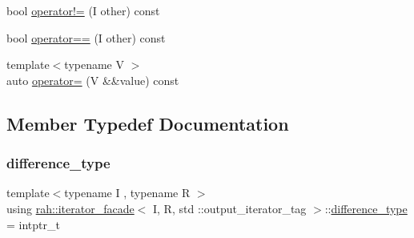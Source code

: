 \begin{DoxyCompactItemize}
\item 
bool \mbox{\hyperlink{structrah_1_1iterator__facade_3_01_i_00_01_r_00_01std_01_1_1output__iterator__tag_01_4_a72c1751a7267f5627a8bd21569a7e147}{operator!=}} (I other) const
\item 
bool \mbox{\hyperlink{structrah_1_1iterator__facade_3_01_i_00_01_r_00_01std_01_1_1output__iterator__tag_01_4_a41db7b320b25b73268ff256590fe306c}{operator==}} (I other) const
\item 
{\footnotesize template$<$typename V $>$ }\\auto \mbox{\hyperlink{structrah_1_1iterator__facade_3_01_i_00_01_r_00_01std_01_1_1output__iterator__tag_01_4_a0f85444e5a2d769ccffae7a6dce9a70d}{operator=}} (V \&\&value) const
\end{DoxyCompactItemize}


\subsection{Member Typedef Documentation}
\mbox{\label{structrah_1_1iterator__facade_3_01_i_00_01_r_00_01std_01_1_1output__iterator__tag_01_4_a3564661cd457ec25b43c0f7a831d1224}} 
\subsubsection{\texorpdfstring{difference\_type}{difference\_type}\hspace{0.1cm}{\footnotesize\ttfamily [1/2]}}
{\footnotesize\ttfamily template$<$typename I , typename R $>$ \\
using \mbox{\hyperlink{structrah_1_1iterator__facade}{rah\+::iterator\+\_\+facade}}$<$ I, R, std \+::output\+\_\+iterator\+\_\+tag $>$\+::\mbox{\hyperlink{structrah_1_1iterator__facade_3_01_i_00_01_r_00_01std_01_1_1output__iterator__tag_01_4_a3564661cd457ec25b43c0f7a831d1224}{difference\+\_\+type}} =  intptr\+\_\+t}

\mbox{\label{structrah_1_1iterator__facade_3_01_i_00_01_r_00_01std_01_1_1output__iterator__tag_01_4_a3564661cd457ec25b43c0f7a831d1224}} 
